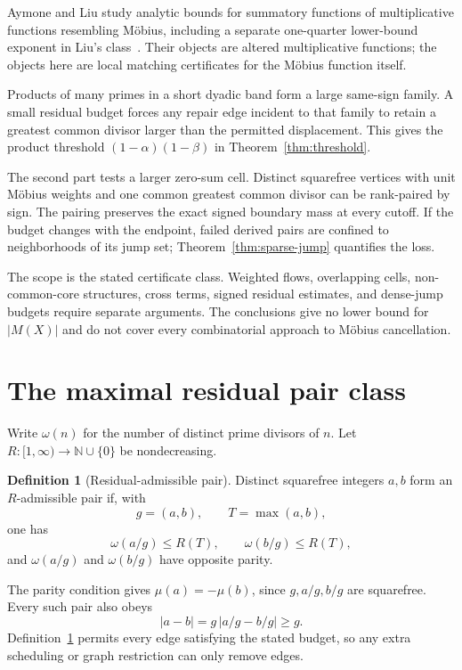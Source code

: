 \documentclass[11pt,a4paper]{amsart}
\theoremstyle{definition}
\newtheorem{definition}[theorem]{Definition}
\theoremstyle{remark}
\newcommand{\N}{\mathbb N}
\newcommand{\mob}{\mu}
\newcommand{\om}{\omega}
\newcommand{\M}{M}
\begin{document}
Aymone and Liu study analytic bounds for summatory functions of
multiplicative functions resembling M\"obius, including a separate
one-quarter lower-bound exponent in Liu's class~\cite{Aymone2020,Liu2023}.
Their objects are altered multiplicative functions; the objects here are
local matching certificates for the M\"obius function itself.

Products of many primes in a short dyadic band form a large same-sign family.
A small residual budget forces any repair
edge incident to that family to retain a greatest common divisor larger than
the permitted displacement.  This gives the product threshold
$(1-\alpha)(1-\beta)$ in Theorem~\ref{thm:threshold}.

The second part tests a larger zero-sum cell.  Distinct squarefree vertices
with unit M\"obius weights and one common greatest common divisor can be
rank-paired by sign.  The pairing preserves the exact signed boundary mass at
every cutoff.  If the budget changes with the endpoint, failed derived pairs
are confined to neighborhoods of its jump set; Theorem~\ref{thm:sparse-jump}
quantifies the loss.

The scope is the stated certificate class.  Weighted flows, overlapping
cells, non-common-core structures, cross terms, signed residual estimates,
and dense-jump budgets require separate arguments.  The conclusions give no
lower bound for $|\M(X)|$ and do not cover every combinatorial approach to
M\"obius cancellation.

\section{The maximal residual pair class}

Write $\om(n)$ for the number of distinct prime divisors of $n$.  Let
$R:[1,\infty)\to\N\cup\{0\}$ be nondecreasing.

\begin{definition}[Residual-admissible pair]\label{def:pair}
Distinct squarefree integers $a,b$ form an $R$-admissible pair if, with
\[
 g=(a,b),\qquad T=\max(a,b),
\]
one has
\begin{equation}\label{eq:budget}
 \om(a/g)\leq R(T),\qquad \om(b/g)\leq R(T),
\end{equation}
and $\om(a/g)$ and $\om(b/g)$ have opposite parity.
\end{definition}

The parity condition gives $\mob(a)=-\mob(b)$, since $g,a/g,b/g$ are
squarefree.  Every such pair also obeys
\begin{equation}\label{eq:gcd-floor}
 |a-b|=g\,|a/g-b/g|\geq g.
\end{equation}
Definition~\ref{def:pair} permits every edge satisfying the stated budget,
so any extra scheduling or graph restriction can only remove edges.
\end{document}
